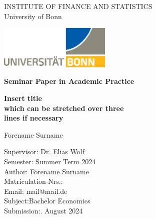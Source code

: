 \thispagestyle{empty}

\begin{center}

\vspace*{-8mm}

{\LARGE INSTITUTE OF FINANCE AND STATISTICS\\[1mm]}
\large University of Bonn\\

\vspace*{1cm}

\includegraphics[width=0.4\textwidth]{./Graphics/UNI_Bonn_Logo_Standard_RZ.eps}

\vspace*{1cm}

{\Large \textbf{Seminar Paper in Academic Practice}}\\ 

\vspace{1cm}

{\Large \textbf{Insert title}}\\ 
\vspace*{1mm}
{\Large \textbf{which can be stretched over three}}\\ 
\vspace*{1mm}
{\Large \textbf{lines if necessary}}\\

\vspace{1.5cm}

{\LARGE Forename Surname}\\[15mm]

\parbox{120mm}{
\begin{large}
\begin{tabbing}
Supervisor: \hspace{1.8cm} \= Dr. Elias Wolf\\[1.5mm]
Semester:\> Summer Term 2024\\[1.5mm]
Author:\> Forename Surname\\[1.5mm] %
Matriculation-Nrs.:\\[1.5mm]
Email:\> mail@mail.de\\[1.5mm]
Subject:\>Bachelor Economics\\[1.5mm]
Submission:. August 2024\\[1.5mm]
\end{tabbing}
\end{large}
}

\end{center}
\clearpage{\pagestyle{empty}\cleardoublepage}
